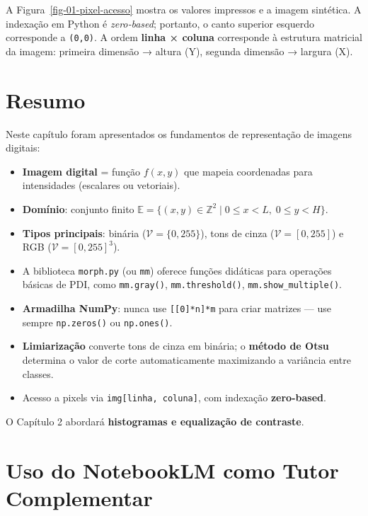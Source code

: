 \documentclass[
  portuguese,
  letterpaper,
  openany,
  oneside,
  12pt,
  a4paper]{book}
\providecommand{\tightlist}{%
  \setlength{\itemsep}{0pt}\setlength{\parskip}{0pt}}
\begin{document}
A Figura~\ref{fig-01-pixel-acesso} mostra os valores impressos e a
imagem sintética. A indexação em Python é \emph{zero‑based}; portanto, o
canto superior esquerdo corresponde a \texttt{(0,0)}. A ordem
\textbf{linha × coluna} corresponde à estrutura matricial da imagem:
primeira dimensão → altura (Y), segunda dimensão → largura (X).

\section{Resumo}\label{resumo}

Neste capítulo foram apresentados os fundamentos de representação de
imagens digitais:

\begin{itemize}
\tightlist
\item
  \textbf{Imagem digital} = função \(f(x,y)\) que mapeia coordenadas
  para intensidades (escalares ou vetoriais).
\item
  \textbf{Domínio}: conjunto finito
  \(\mathbb{E} = \{(x,y) \in \mathbb{Z}^2 \mid 0 \le x < L,\; 0 \le y < H\}\).
\item
  \textbf{Tipos principais}: binária (\(\mathcal{V} = \{0, 255\}\)),
  tons de cinza (\(\mathcal{V} = [0,255]\)) e RGB
  (\(\mathcal{V} = [0,255]^3\)).
\item
  A biblioteca \texttt{morph.py} (ou \texttt{mm}) oferece funções
  didáticas para operações básicas de PDI, como \texttt{mm.gray()},
  \texttt{mm.threshold()}, \texttt{mm.show\_multiple()}.
\item
  \textbf{Armadilha NumPy}: nunca use \texttt{{[}{[}0{]}*n{]}*m} para
  criar matrizes --- use sempre \texttt{np.zeros()} ou
  \texttt{np.ones()}.
\item
  \textbf{Limiarização} converte tons de cinza em binária; o
  \textbf{método de Otsu} determina o valor de corte automaticamente
  maximizando a variância entre classes.
\item
  Acesso a pixels via \texttt{img{[}linha,\ coluna{]}}, com indexação
  \textbf{zero-based}.
\end{itemize}

O Capítulo 2 abordará \textbf{histogramas e equalização de contraste}.

\section{\texorpdfstring{ Uso do NotebookLM como Tutor
Complementar}{ Uso do NotebookLM como Tutor Complementar}}\label{uso-do-notebooklm-como-tutor-complementar}
\end{document}
